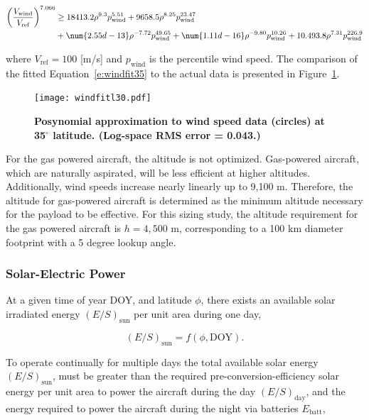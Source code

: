 \begin{align}
    \left(\frac{V_{\text{wind}}}{V_{\text{ref}}}\right)^{7.066} &\geq 18413.2\rho^{9.3}p_{\text{wind}}^{5.51} + 9658.5\rho^{8.25}p_{\text{wind}}^{23.47} \nonumber \\
    \label{e:windfit35}
    &+ \num{2.55d-13}\rho^{-7.72}p_{\text{wind}}^{49.65} + \num{1.11d-16}\rho^{-9.80}p_{\text{wind}}^{10.26} + 10.493.8\rho^{7.31}p_{\text{wind}}^{226.9}
\end{align}

where $V_{\text{ref}} = 100$ [m/s] and $p_{\text{wind}}$ is the percentile wind speed. The comparison of the fitted Equation~\eqref{e:windfit35} to the actual data is presented in Figure~\ref{f:windfitl35}. 

\begin{figure}[H]
	\begin{center}
	\texttt{[image: windfitl30.pdf]}
    \caption{\textbf{Posynomial approximation to wind speed data\cite{wind} (circles) at 35$^{\circ}$ latitude. (Log-space RMS error = 0.043.)}}
	\label{f:windfitl35}
	\end{center}
\end{figure}

For the gas powered aircraft, the altitude is not optimized.  
Gas-powered aircraft, which are naturally aspirated, will be less efficient at higher altitudes.  
Additionally, wind speeds increase nearly linearly up to 9,100 m.  
Therefore, the altitude for gas-powered aircraft is determined as the minimum altitude necessary for the payload to be effective.\cite{orion}
For this sizing study, the altitude requirement for the gas powered aircraft is $h=4,500$ m, corresponding to a 100 km diameter footprint with a 5 degree lookup angle. 

\subsubsection{Solar-Electric Power}

At a given time of year DOY, and latitude $\phi$, there exists an available solar irradiated energy $(E/S)_{\text{sun}}$ per unit area during one day,

\begin{equation}
    \label{e:solarfunc}
    (E/S)_{\text{sun}} = f(\phi, \text{DOY}).
\end{equation}

To operate continually for multiple days the total available solar energy $(E/S)_{\text{sun}}$, must be greater than the required pre-conversion-efficiency solar energy per unit area to power the aircraft during the day $(E/S)_{\text{day}}$, and the energy required to power the aircraft during the night via batteries $E_{\text{batt}}$,\cite{solartech}

